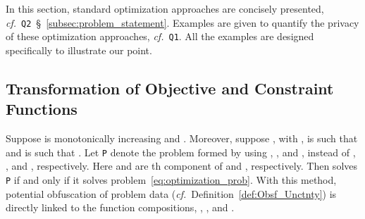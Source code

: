 \documentclass[12pt,draftcls,onecolumn]{IEEEtran}
\newcommand{\cf}{{\textit{cf.}}}
\newcommand{\addnew}[1]{{{\color{blue!0!black}#1}}}
\begin{document}
\addnew
{
In this section, standard optimization approaches are concisely presented, \cf~\texttt{Q2}~\S~\ref{subsec:problem_statement}. Examples are given to quantify the privacy of these optimization approaches, \cf~\texttt{Q1}. All the examples are designed specifically to illustrate our point.}

\vspace{-1mm}
\subsection{Transformation of Objective and Constraint Functions}\label{subsec:Obj-Cons_transformation}

\addnew
{
Suppose  is monotonically increasing and . Moreover, suppose , with , is such that  and  is such that . Let \texttt{P} denote the problem formed by using  , , and , instead of , , and , respectively. Here  and  are th component of  and , respectively. Then  solves \texttt{P} if and only if it solves problem~\eqref{eq:optimization_prob}. With this method, potential obfuscation of problem data (\cf~Definition~\ref{def:Obsf_Unctnty}) is directly linked to the function compositions, , , and .
}
\end{document}
